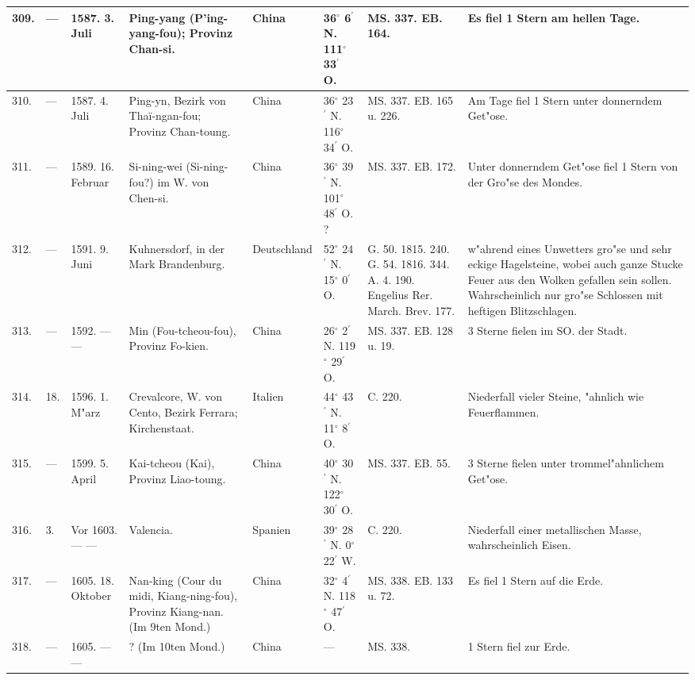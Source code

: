 \documentclass[a4paper, 8pt, oneside, polutonikogreek, german]{article}
\begin{document}
\begin{center}
\begin{longtable}{| p{5mm} | p{3mm} | p{15mm} | p{25mm} | p{20mm} | p{14mm} | p{17mm} | p{24mm} |}
        309. & --- & 1587. 3. Juli & Ping-yang (P’ing-yang-fou); Provinz Chan-si. & China & 36$^\circ$ 6$^\prime$ N. 111$^\circ$ 33$^\prime$ O. & MS. 337. EB. 164. & Es fiel 1 Stern am hellen Tage. \\ \hline
        310. & --- & 1587. 4. Juli & Ping-yn, Bezirk von Thaï-ngan-fou; Provinz Chan-toung. & China & 36$^\circ$ 23$^\prime$ N. 116$^\circ$ 34$^\prime$ O. & MS. 337. EB. 165 u. 226. & Am Tage fiel 1 Stern unter donnerndem Get"ose. \\ \hline
        311. & --- & 1589. 16. Februar & Si-ning-wei (Si-ning-fou?) im W. von Chen-si. & China & 36$^\circ$ 39$^\prime$ N. 101$^\circ$ 48$^\prime$ O. ? & MS. 337. EB. 172. & Unter donnerndem Get"ose fiel 1 Stern von der Gro"se des Mondes. \\ \hline
        312. & --- & 1591. 9. Juni & Kuhnersdorf, in der Mark Brandenburg. & Deutschland & 52$^\circ$ 24$^\prime$ N. 15$^\circ$ 0$^\prime$ O. & G. 50. 1815. 240. G. 54. 1816. 344. A. 4. 190. Engelius Rer. March. Brev. 177. & w"ahrend eines Unwetters gro"se und sehr eckige Hagelsteine, wobei auch ganze Stucke Feuer aus den Wolken gefallen sein sollen. Wahrscheinlich nur gro"se Schlossen mit heftigen Blitzschlagen. \\ \hline
        313. & --- & 1592. --- --- & Min (Fou-tcheou-fou), Provinz Fo-kien. & China & 26$^\circ$ 2$^\prime$ N. 119$^\circ$ 29$^\prime$ O. & MS. 337. EB. 128 u. 19. & 3 Sterne fielen im SO. der Stadt. \\ \hline
        314. & 18. & 1596. 1. M"arz & Crevalcore, W. von Cento, Bezirk Ferrara; Kirchenstaat. & Italien & 44$^\circ$ 43$^\prime$ N. 11$^\circ$ 8$^\prime$ O. & C. 220. & Niederfall vieler Steine, "ahnlich wie Feuerflammen. \\ \hline
        315. & --- & 1599. 5. April & Kai-tcheou (Kai), Provinz Liao-toung. & China & 40$^\circ$ 30$^\prime$ N. 122$^\circ$ 30$^\prime$ O. & MS. 337. EB. 55. & 3 Sterne fielen unter trommel"ahnlichem Get"ose. \\ \hline
        316. & 3. & Vor 1603. --- --- & Valencia. & Spanien & 39$^\circ$ 28$^\prime$ N. 0$^\circ$ 22$^\prime$ W. & C. 220. & Niederfall einer metallischen Masse, wahrscheinlich Eisen. \\ \hline
        317. & --- & 1605. 18. Oktober & Nan-king (Cour du midi, Kiang-ning-fou), Provinz Kiang-nan. (Im 9ten Mond.) & China & 32$^\circ$ 4$^\prime$ N. 118$^\circ$ 47$^\prime$ O. & MS. 338. EB. 133 u. 72. & Es fiel 1 Stern auf die Erde. \\ \hline
        318. & --- & 1605. --- --- & ? (Im 10ten Mond.) & China & --- & MS. 338. & 1 Stern fiel zur Erde. \\ \hline

\end{longtable}
\end{center}
\end{document}

